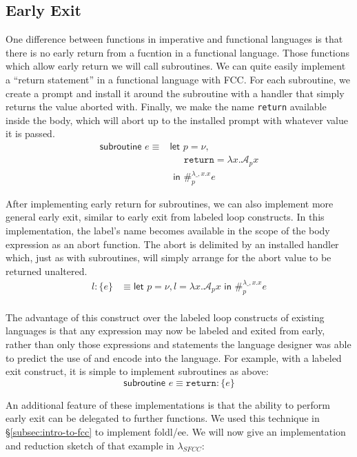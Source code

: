 \documentclass[11pt]{article}
\newcommand{\maybePage}{\null}
\newcommand\x{\lambda x}
\newcommand{\letin}[2]{\textsf{let }#1\textsf{ in }#2}
\newcommand\A{\mathcal{A}}
\begin{document}
\maybePage
\subsection{Early Exit}
\label{subsec:earlyExit}

One difference between functions in imperative and functional languages is that there is no early return from a fucntion in a functional language.
Those functions which allow early return we will call subroutines.
We can quite easily implement a ``return statement'' in a functional language with FCC.
For each subroutine, we create a prompt and install it around the subroutine with a handler that simply returns the value aborted with.
Finally, we make the name \texttt{return} available inside the body, which will abort up to the installed prompt with whatever value it is passed.
\begin{align*}
\textsf{subroutine }e \equiv{}
	&\letin{p=\nu, \\
	&\quad\;\, \texttt{return}=\x.\A_px \\
	&}{
	\#_p^{\lambda \_,x.x}e}
\end{align*}



After implementing early return for subroutines, we can also implement more general early exit, similar to early exit from labeled loop constructs.
In this implementation, the label's name becomes available in the scope of the body expression as an abort function.
The abort is delimited by an installed handler which, just as with subroutines, will simply arrange for the abort value to be returned unaltered.
\begin{align*}
l\!: \{e\} &\equiv \letin{p = \nu, l = \x.\A_px}{\#_p^{\lambda \_,x.x}e} \\
\end{align*}

The advantage of this construct over the labeled loop constructs of existing languages is that any expression may now be labeled and exited from early, rather than only those expressions and statements the language designer was able to predict the use of and encode into the language.
For example, with a labeled exit construct, it is simple to implement subroutines as above:
$$\textsf{subroutine }e \equiv \texttt{return}\!:\{e\}$$





An additional feature of these implementations is that the ability to perform early exit can be delegated to further functions.
We used this technique in \S\ref{subsec:intro-to-fcc} to implement foldl/ee.
We will now give an implementation and reduction sketch of that example in $\lambda_{SFCC}$:
\end{document}
